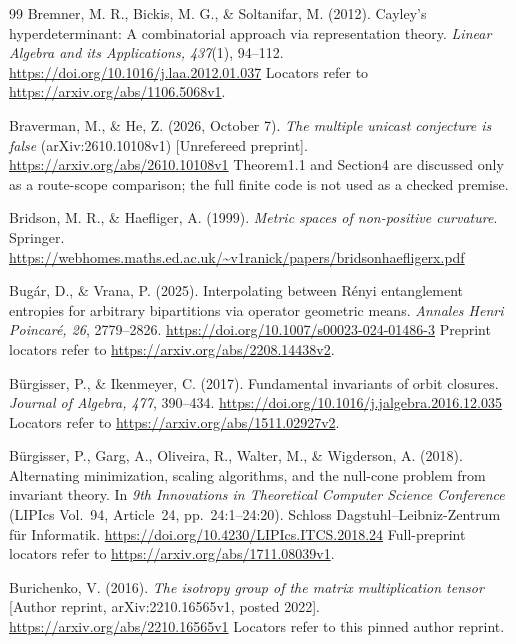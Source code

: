 \begin{thebibliography}{99}
Bremner, M. R., Bickis, M. G., \& Soltanifar, M. (2012).
Cayley's hyperdeterminant: A combinatorial approach via representation
theory. \emph{Linear Algebra and its Applications, 437}(1), 94--112.
\url{https://doi.org/10.1016/j.laa.2012.01.037}
Locators refer to \url{https://arxiv.org/abs/1106.5068v1}.

Braverman, M., \& He, Z. (2026, October 7).
\emph{The multiple unicast conjecture is false}
(arXiv:2610.10108v1) [Unrefereed preprint].
\url{https://arxiv.org/abs/2610.10108v1}
Theorem1.1 and Section4 are discussed only as a route-scope
comparison; the full finite code is not used as a checked premise.

Bridson, M. R., \& Haefliger, A. (1999).
\emph{Metric spaces of non-positive curvature}. Springer.
\url{https://webhomes.maths.ed.ac.uk/~v1ranick/papers/bridsonhaefligerx.pdf}

Bug\'ar, D., \& Vrana, P. (2025).
Interpolating between R\'enyi entanglement entropies for arbitrary
bipartitions via operator geometric means.
\emph{Annales Henri Poincar\'e, 26}, 2779--2826.
\url{https://doi.org/10.1007/s00023-024-01486-3}
Preprint locators refer to \url{https://arxiv.org/abs/2208.14438v2}.

B\"urgisser, P., \& Ikenmeyer, C. (2017).
Fundamental invariants of orbit closures.
\emph{Journal of Algebra, 477}, 390--434.
\url{https://doi.org/10.1016/j.jalgebra.2016.12.035}
Locators refer to \url{https://arxiv.org/abs/1511.02927v2}.

B\"urgisser, P., Garg, A., Oliveira, R., Walter, M., \& Wigderson, A.
(2018). Alternating minimization, scaling algorithms, and the null-cone
problem from invariant theory. In \emph{9th Innovations in Theoretical
Computer Science Conference} (LIPIcs Vol.~94, Article~24,
pp.~24:1--24:20). Schloss Dagstuhl--Leibniz-Zentrum f\"ur Informatik.
\url{https://doi.org/10.4230/LIPIcs.ITCS.2018.24}
Full-preprint locators refer to \url{https://arxiv.org/abs/1711.08039v1}.

Burichenko, V. (2016). \emph{The isotropy group of the matrix
multiplication tensor} [Author reprint, arXiv:2210.16565v1,
posted 2022]. \url{https://arxiv.org/abs/2210.16565v1}
Locators refer to this pinned author reprint.


\end{thebibliography}
